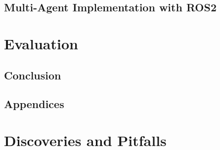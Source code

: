 \documentclass[conference]{IEEEtran}
\begin{document}
\subsection{Multi-Agent Implementation with ROS2}

\section{Evaluation}

\subsection{Conclusion}

\subsection{Appendices}

\section{Discoveries and Pitfalls}  

\nocite{*}

\vspace{12pt}
\end{document}
